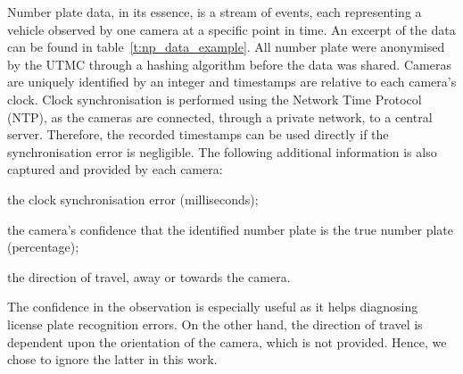 Number plate data, in its essence, is a stream of events, each representing a vehicle observed by one camera at a specific point in time. An excerpt of the data can be found in table~\ref{t:np_data_example}. All number plate were anonymised by the UTMC through a hashing algorithm before the data was shared. Cameras are uniquely identified by an integer and timestamps are relative to each camera's clock. Clock synchronisation is performed using the Network Time Protocol (NTP), as the cameras are connected, through a private network, to a central server. Therefore, the recorded timestamps can be used directly if the synchronisation error is negligible. The following additional information is also captured and provided by each camera:
\begin{enumerate*}[label=(\roman*)]
  \item the clock synchronisation error (milliseconds);
  \item the camera's confidence that the identified number plate is the true number plate (percentage);
  \item the direction of travel, away or towards the camera.
\end{enumerate*}
The confidence in the observation is especially useful as it helps diagnosing license plate recognition errors. On the other hand, the direction of travel is dependent upon the orientation of the camera, which is not provided. Hence, we chose to ignore the latter in this work.
